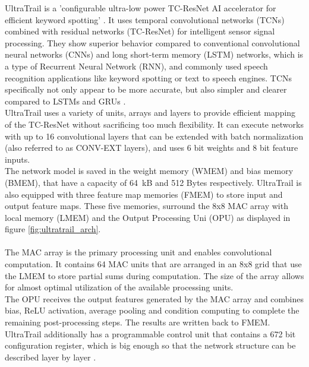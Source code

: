 UltraTrail is a 'configurable ultra-low power TC-ResNet AI accelerator for efficient keyword spotting' \cite{ultratrail}.
It uses temporal convolutional networks (TCNs) combined with residual networks (TC-ResNet) for intelligent sensor signal processing.
They show superior behavior compared to conventional convolutional neural networks (CNNs) and long short-term memory (LSTM) networks,
which is a type of Recurrent Neural Network (RNN), and commonly used speech recognition applications like keyword spotting or text to speech engines.
TCNs specifically not only appear to be more accurate, but also simpler and clearer compared to LSTMs and GRUs \cite[Ch I]{ultratrail}.\\
UltraTrail uses a variety of units, arrays and layers to provide efficient mapping of the TC-ResNet without sacrificing too much flexibility.
It can execute networks with up to 16 convolutional layers that can be extended with batch normalization (also referred to as CONV-EXT layers),
and uses 6 bit weights and 8 bit feature inputs.\\
The network model is saved in the weight memory (WMEM) and bias memory (BMEM), that
have a capacity of 64 kB and 512 Bytes respectively.
UltraTrail is also equipped with three feature map memories (FMEM) to store input and output
feature maps.
These five memories, surround the 8x8 MAC array with local memory (LMEM) and the Output Processing Uni (OPU) as displayed in figure \ref{fig:ultratrail_arch}.
\\\\
The MAC array is the primary processing unit and enables convolutional computation.
It contains 64 MAC units that are arranged in an 8x8 grid that use the LMEM to store partial sums during computation.
The size of the array allows for almost optimal utilization of the available processing units.
\\
The OPU receives the output features generated by the MAC array and combines bias, ReLU activation,
average pooling and condition computing to complete the remaining post-processing steps.
The results are written back to FMEM.
\\
UltraTrail additionally has a programmable control unit that contains a 672 bit
configuration register, which is big enough so that the network structure
can be described layer by layer \cite[Ch IV]{ultratrail}.



